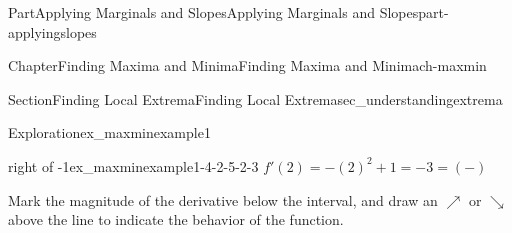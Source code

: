 \documentclass[oneside,10pt,]{tufte-book}
\numberwithin{equation}{chapter}
\begin{document}
\begin{partptx}{Part}{Applying Marginals and Slopes}{}{Applying Marginals and Slopes}{}{}{part-applyingslopes}
\begin{chapterptx}{Chapter}{Finding Maxima and Minima}{}{Finding Maxima and Minima}{}{}{ch-maxmin}
\begin{sectionptx}{Section}{Finding Local Extrema}{}{Finding Local Extrema}{}{}{sec_understandingextrema}
\begin{exploration}{Exploration}{}{ex_maxminexample1}
\begin{enumerate}[font=\bfseries,label=(\alph*),ref=\alph*]
\begin{descriptionlist}
\begin{dlimedium}{right of -1}{ex_maxminexample1-4-2-5-2-3}
 \(f'(2) = -(2)^2 + 1 = -3 = (-)\)\end{dlimedium}%
\end{descriptionlist}
Mark the magnitude of the derivative below the interval, and draw an \(\nearrow\) or \(\searrow\) above the line to indicate the behavior of the function.%
\par
\begin{image}{0.25}{0.5}{0.25}{}%
\end{image}
\end{enumerate}
\end{exploration}
\end{sectionptx}
\end{chapterptx}
\end{partptx}
\end{document}
